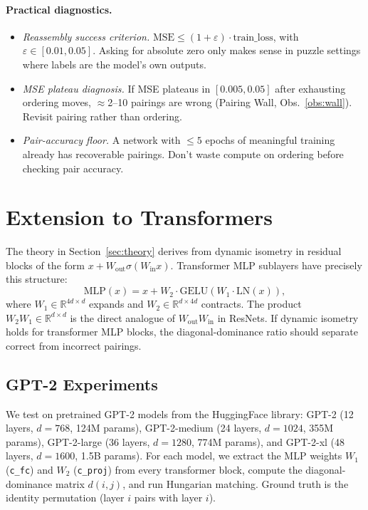 \documentclass[10pt]{article}
\theoremstyle{remark}
\begin{document}
\paragraph{Practical diagnostics.}
\begin{itemize}[leftmargin=*,itemsep=0pt]
  \item \emph{Reassembly success criterion.}
        $\mathrm{MSE} \leq (1{+}\varepsilon) \cdot \mathrm{train\_loss}$,
        with $\varepsilon \in [0.01, 0.05]$. Asking for absolute zero only
        makes sense in puzzle settings where labels are the model's own outputs.
  \item \emph{MSE plateau diagnosis.} If MSE plateaus in $[0.005, 0.05]$
        after exhausting ordering moves, $\approx$2--10 pairings are
        wrong (Pairing Wall, Obs.~\ref{obs:wall}). Revisit pairing
        rather than ordering.
  \item \emph{Pair-accuracy floor.} A network with $\leq 5$ epochs of
        meaningful training already has recoverable pairings. Don't
        waste compute on ordering before checking pair accuracy.
\end{itemize}

\section{Extension to Transformers}\label{sec:transformers}

The theory in Section~\ref{sec:theory} derives from dynamic isometry
in residual blocks of the form $x + W_{\mathrm{out}} \sigma(W_{\mathrm{in}} x)$.
Transformer MLP sublayers have precisely this structure:
\[
  \text{MLP}(x) = x + W_2 \cdot \text{GELU}(W_1 \cdot \text{LN}(x)),
\]
where $W_1 \in \mathbb{R}^{4d \times d}$ expands and $W_2 \in \mathbb{R}^{d \times 4d}$
contracts. The product $W_2 W_1 \in \mathbb{R}^{d \times d}$ is the direct analogue
of $W_{\mathrm{out}} W_{\mathrm{in}}$ in ResNets. If dynamic isometry holds for
transformer MLP blocks, the diagonal-dominance ratio should separate correct
from incorrect pairings.

\subsection{GPT-2 Experiments}

We test on pretrained GPT-2 models from the HuggingFace library:
GPT-2 (12 layers, $d{=}768$, 124M params),
GPT-2-medium (24 layers, $d{=}1024$, 355M params),
GPT-2-large (36 layers, $d{=}1280$, 774M params), and
GPT-2-xl (48 layers, $d{=}1600$, 1.5B params).
For each model, we extract the MLP weights $W_1$ (\texttt{c\_fc}) and
$W_2$ (\texttt{c\_proj}) from every transformer block, compute the
diagonal-dominance matrix $d(i,j)$, and run Hungarian matching.
Ground truth is the identity permutation (layer $i$ pairs with layer $i$).
\end{document}
